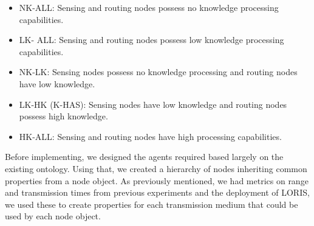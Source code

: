 	\begin{itemize}
		\item NK-ALL: Sensing and routing nodes possess no knowledge processing capabilities.
		\item LK- ALL: Sensing and routing nodes possess low knowledge processing capabilities.
		\item NK-LK: Sensing nodes possess no knowledge processing and routing nodes have low knowledge.
		\item LK-HK (K-HAS): Sensing nodes have low knowledge and routing nodes possess high knowledge.
		\item HK-ALL: Sensing and routing nodes have high processing capabilities.
	\end{itemize}



Before implementing, we designed the agents required based largely on the existing ontology. Using that, we created a hierarchy of nodes inheriting common properties from a node object. As previously mentioned, we had metrics on range and transmission times from previous experiments and the deployment of LORIS, we used these to create properties for each transmission medium that could be used by each node object.

